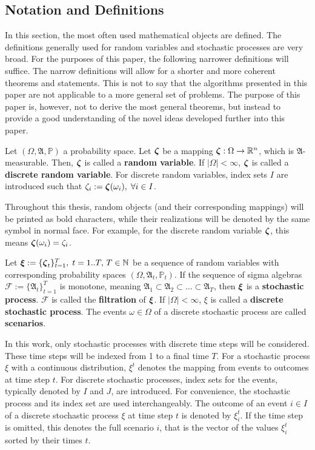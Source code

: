 \subsection{Notation and Definitions}
In this section, the most often used mathematical objects are defined.
The definitions generally used for random variables and stochastic processes are very broad.
For the purposes of this paper, the following narrower definitions will suffice.
The narrow definitions will allow for a shorter and more coherent theorems and statements.
This is not to say that the algorithms presented in this paper are not applicable to a more general set of problems.
The purpose of this paper is, however, not to derive the most general theorems, but instead to provide a good understanding of the novel ideas developed further into this paper.
\begin{definition}
  Let $(\Omega, \mathfrak{A}, \mathbb{P})$ a probability space.
  Let $\boldsymbol\zeta$ be a mapping $\boldsymbol\zeta:\Omega\rightarrow\mathbb{R}^n$, which is $\mathfrak{A}$-measurable.
  Then, $\boldsymbol\zeta$ is called a \textbf{random variable}.
  If $|\Omega|<\infty$, $\boldsymbol\zeta$ is called a \textbf{discrete random variable}.
  For discrete random variables, index sets $I$ are introduced such that $\zeta_i :=\boldsymbol\zeta(\omega_i),\;\forall i\in I$.
\end{definition}
\begin{remark}
  Throughout this thesis, random objects (and their corresponding mappings) will be printed as bold characters, while their realizations will be denoted by the same symbol in normal face.
  For example, for the discrete random variable $\boldsymbol\zeta$, this means $\boldsymbol\zeta(\omega_i) = \zeta_i$.
\end{remark}
\begin{definition}
  Let $\boldsymbol\xi:=\{\boldsymbol\zeta_t\}_{t=1}^T,\; t=1..T,\, T\in\mathbb{N}$ be a sequence of random variables with corresponding probability spaces $(\Omega, \mathfrak{A}_t, \mathbb{P}_t)$.
  If the sequence of sigma algebras $\mathcal{F}:=\{\mathfrak{A}_t\}_{t=1}^T$ is monotone, meaning $\mathfrak{A}_1\subset\mathfrak{A}_2\subset\ldots\subset\mathfrak{A}_T$, then $\boldsymbol\xi$ is a \textbf{stochastic process}.
  $\mathcal{F}$ is called the \textbf{filtration} of $\boldsymbol\xi$.
  If $|\Omega|<\infty$, $\xi$ is called a \textbf{discrete stochastic process}.
  The events $\omega\in\Omega$ of a discrete stochastic process are called \textbf{scenarios}.
\end{definition}
In this work, only stochastic processes with discrete time steps will be considered.
These time steps will be indexed from 1 to a final time $T$.
For a stochastic process $\xi$ with a continuous distribution, $\xi^t$ denotes the mapping from events to outcomes at time step $t$.
For discrete stochastic processes, index sets for the events, typically denoted by $I$ and $J$, are introduced.
For convenience, the stochastic process and its index set are used interchangeably.
The outcome of an event $i\in I$ of a discrete stochastic process $\xi$ at time step $t$ is denoted by $\xi_i^t$.
If the time step is omitted, this denotes the full scenario $i$, that is the vector of the values $\xi_i^t$ sorted by their times $t$.

